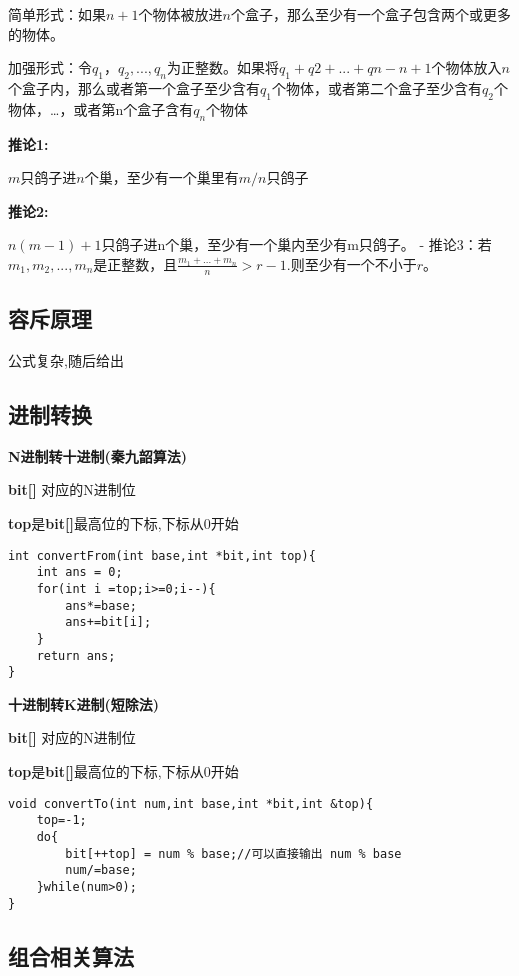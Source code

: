  简单形式：如果$n+1$个物体被放进$n$个盒子，那么至少有一个盒子包含两个或更多的物体。

加强形式：令$q_1，q_2,...,q_n$为正整数。如果将$q_1+q2+...+qn-n+1$个物体放入$n$个盒子内，那么或者第一个盒子至少含有$q_1$个物体，或者第二个盒子至少含有$q_2$个物体，…，或者第n个盒子含有$q_n$个物体

\textbf{推论1:}

$m$只鸽子进$n$个巢，至少有一个巢里有$m/n$只鸽子

\textbf{推论2:}

$n(m-1)+1$只鸽子进n个巢，至少有一个巢内至少有m只鸽子。
  - 推论3：若$m_1,m_2,...,m_n$是正整数，且$\frac{m_1+...+m_n}{n}>r-1$.则至少有一个不小于$r$。


\subsection{容斥原理}

公式复杂,随后给出

\subsection{进制转换}

\textbf{N进制转十进制(秦九韶算法)}

\textbf{bit[]} 对应的N进制位

\textbf{top}是\textbf{bit[]}最高位的下标,下标从0开始

\begin{lstlisting}
int convertFrom(int base,int *bit,int top){
    int ans = 0;
    for(int i =top;i>=0;i--){
        ans*=base;
        ans+=bit[i];
    }
    return ans;
}
\end{lstlisting}

\textbf{十进制转K进制(短除法)}

\textbf{bit[]} 对应的N进制位

\textbf{top}是\textbf{bit[]}最高位的下标,下标从0开始

\begin{lstlisting}
void convertTo(int num,int base,int *bit,int &top){
    top=-1;
    do{
        bit[++top] = num % base;//可以直接输出 num % base
        num/=base;
    }while(num>0);
}
\end{lstlisting}

\subsection{组合相关算法}

